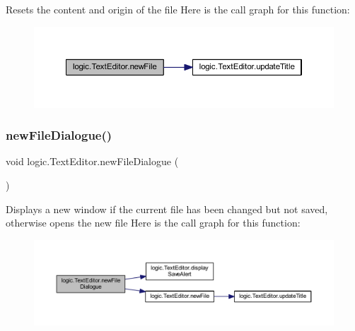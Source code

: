 Resets the content and origin of the file Here is the call graph for this function\+:\nopagebreak
\begin{figure}[H]
\begin{center}
\leavevmode
\includegraphics[width=350pt]{classlogic_1_1_text_editor_a03b71fe113e6549963206a005913176a_cgraph}
\end{center}
\end{figure}
\mbox{\label{classlogic_1_1_text_editor_aad7f5f3f95ab498ee16d09f0f198c0c9}} 
\subsubsection{\texorpdfstring{new\+File\+Dialogue()}{newFileDialogue()}}
{\footnotesize\ttfamily void logic.\+Text\+Editor.\+new\+File\+Dialogue (\begin{DoxyParamCaption}{ }\end{DoxyParamCaption})}

Displays a new window if the current file has been changed but not saved, otherwise opens the new file Here is the call graph for this function\+:\nopagebreak
\begin{figure}[H]
\begin{center}
\leavevmode
\includegraphics[width=350pt]{classlogic_1_1_text_editor_aad7f5f3f95ab498ee16d09f0f198c0c9_cgraph}
\end{center}
\end{figure}
\mbox{\label{classlogic_1_1_text_editor_a52437fbd2159a657602a75860c18051f}} 
